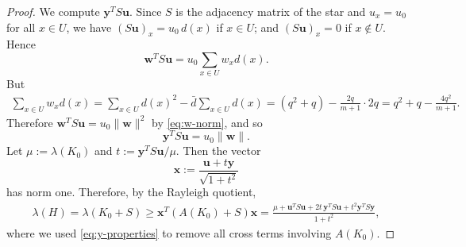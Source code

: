 \documentclass[11pt,a4paper]{article}
\theoremstyle{definition}
\theoremstyle{plain}
\renewcommand{\ge}{\geqslant}
\begin{document}
\begin{proof}
We compute $\bm{y}^TS \bm{u}$. Since $S$ is the adjacency matrix of the star and $u_x=u_0$ for all
$x\in U$, we have 
$ (S \bm{u})_x=u_0 \,d(x)$ if 
$x\in U$; 
and $(S \bm{u})_x=0$ if $x\notin U$. Hence
\[
        \bm{w}^TS \bm{u}=u_0\sum_{x\in U}w_xd(x).
\]
But
\begin{align*}
        \sum_{x\in U}w_xd(x)
          =\sum_{x\in U}d(x)^2-\bar d\sum_{x\in U}d(x)  
        =(q^2+q)-\frac{2q}{m+1}\cdot 2q 
        =q^2+q-\frac{4q^2}{m+1}.
\end{align*}
Therefore
$ \bm{w}^TS \bm{u}=u_0\| \bm{w} \|^2$ by \eqref{eq:w-norm}, 
and so
\begin{equation}
        \bm{y}^TS \bm{u}=u_0\| \bm{w} \|.
        \label{eq:ySu}
\end{equation} 
Let $  \mu:=\lambda(K_0)$ and $ t:={\bm{y}^TS \bm{u}}/{\mu}$. 
Then the vector
\[
        \bm{x}:=\frac{\bm{u}+t \bm{y}}{\sqrt{1+t^2}}
\]
has norm one. Therefore, by the Rayleigh quotient,
\begin{align} 
        \lambda(H)
        =\lambda(K_0+S)  
        \ge \bm{x}^T(A(K_0)+S) \bm{x}  =\frac{\mu+ \bm{u}^TS \bm{u}+2t\,\bm{y}^TS\bm{u} 
        +t^2\bm{y}^TS\bm{y}}{1+t^2},
        \label{eq:rayleigh-star}
\end{align}
where we used \eqref{eq:y-properties} to remove all cross terms involving $A(K_0)$.


\end{proof}
\end{document}
